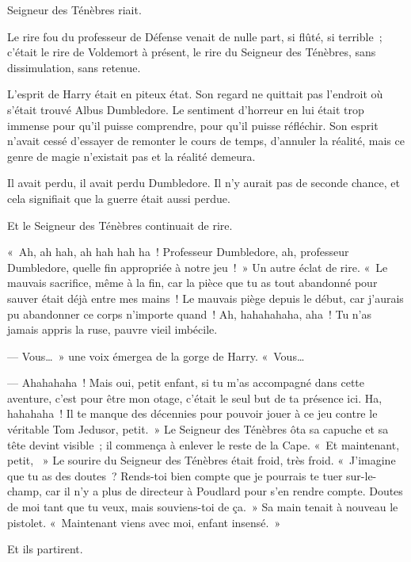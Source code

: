 
 Seigneur des Ténèbres riait.

\hplettrineextrapara
Le rire fou du professeur de Défense venait de nulle part, si flûté, si terrible~; c'était le rire de Voldemort à présent, le rire du Seigneur des Ténèbres, sans dissimulation, sans retenue.

L'esprit de Harry était en piteux état.
Son regard ne quittait pas l'endroit où s'était trouvé Albus Dumbledore.
Le sentiment d'horreur en lui était trop immense pour qu'il puisse comprendre, pour qu'il puisse réfléchir.
Son esprit n'avait cessé d'essayer de remonter le cours de temps, d'annuler la réalité, mais ce genre de magie n'existait pas et la réalité demeura.

Il avait perdu, il avait perdu Dumbledore.
Il n'y aurait pas de seconde chance, et cela signifiait que la guerre était aussi perdue.

Et le Seigneur des Ténèbres continuait de rire.

«~Ah, ah hah, ah hah hah ha~!
Professeur Dumbledore, ah, professeur Dumbledore, quelle fin appropriée à notre jeu~!~»
Un autre éclat de rire.
«~Le mauvais sacrifice, même à la fin, car la pièce que tu as tout abandonné pour sauver était déjà entre mes mains~!
Le mauvais piège depuis le début, car j'aurais pu abandonner ce corps n'importe quand~!
Ah, hahahahaha, aha~!
Tu n'as jamais appris la ruse, pauvre vieil imbécile.

--- Vous…~»
une voix émergea de la gorge de Harry.
«~Vous…

--- Ahahahaha~!
Mais oui, petit enfant, si tu m'as accompagné dans cette aventure, c'est pour être mon otage, c'était le seul but de ta présence ici.
Ha, hahahaha~!
Il te manque des décennies pour pouvoir jouer à ce jeu contre le véritable Tom Jedusor, petit.~»
Le Seigneur des Ténèbres ôta sa capuche et sa tête devint visible~; il commença à enlever le reste de la Cape.
«~Et maintenant, petit, ~» Le sourire du Seigneur des Ténèbres était froid, très froid.
«~J'imagine que tu as des doutes~?
Rends-toi bien compte que je pourrais te tuer sur-le-champ, car il n'y a plus de directeur à Poudlard pour s'en rendre compte.
Doutes de moi tant que tu veux, mais souviens-toi de ça.~»
Sa main tenait à nouveau le pistolet.
«~Maintenant viens avec moi, enfant insensé.~»

Et ils partirent.

